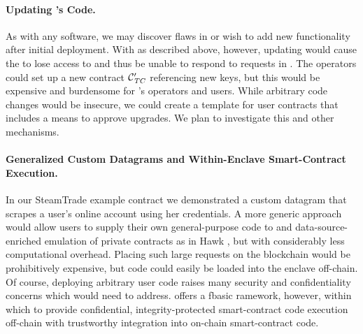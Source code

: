 \paragraph{Updating \tc's Code.}
As with any software, we may discover flaws in \tc or wish to add new functionality after initial deployment.
With \tc as described above, however, updating \engine would cause the \encname to lose access to \skTC and thus be unable to respond to requests in \tcont.
The \tc operators could set up a new contract $\tcont'$ referencing new keys, but this would be expensive and burdensome for \tc's operators and users.
While arbitrary code changes would be insecure, we could create a template for user contracts that includes a means to approve upgrades.
We plan to investigate this and other mechanisms.

\paragraph{Generalized Custom Datagrams and Within-Enclave Smart-Contract Execution.}
In our {\sf SteamTrade} example contract we demonstrated a custom datagram that scrapes a user's online account using her credentials.
A more generic approach would allow users to supply their own general-purpose code to \tc and data-source-enriched emulation of private contracts as in Hawk \cite{hawk}, but with considerably less computational overhead.
Placing such large requests on the blockchain would be prohibitively expensive, but code could easily be loaded into the \tc enclave off-chain.
Of course, deploying arbitrary user code raises many security and confidentiality concerns which \tc would need to address. \tc offers a fbasic ramework, however, within which to provide confidential, integrity-protected smart-contract code execution off-chain with trustworthy integration into on-chain smart-contract code.

